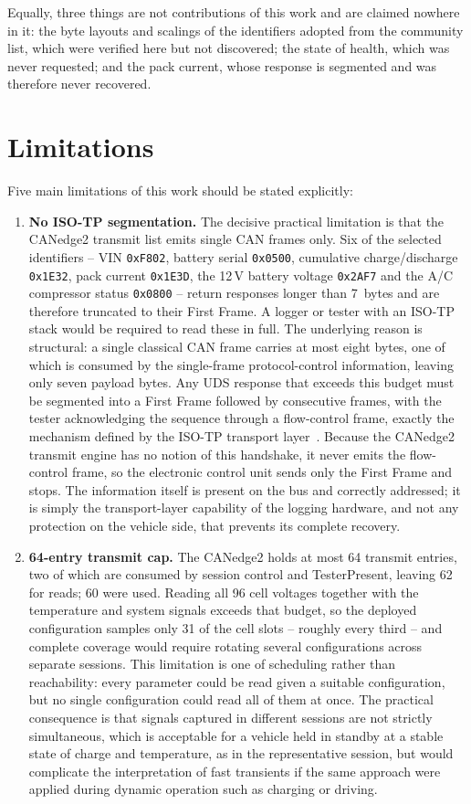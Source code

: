 \documentclass[11pt,a4paper,oneside,parskip=half]{scrreprt}
\providecommand{\hex}{}\renewcommand{\hex}[1]{\texttt{0x#1}}
\begin{document}
\noindent Equally, three things are not contributions of this work and are claimed nowhere in it: the byte layouts and scalings of the identifiers adopted from the community list, which were verified here but not discovered; the state of health, which was never requested; and the pack current, whose response is segmented and was therefore never recovered.

\section{Limitations}
Five main limitations of this work should be stated explicitly:

\begin{enumerate}
  \item \textbf{No ISO-TP segmentation.} The decisive practical limitation is that the CANedge2 transmit list emits single CAN frames only. Six of the selected identifiers -- VIN \hex{F802}, battery serial \hex{0500}, cumulative charge/discharge \hex{1E32}, pack current \hex{1E3D}, the 12\,V battery voltage \hex{2AF7} and the A/C compressor status \hex{0800} -- return responses longer than 7~bytes and are therefore truncated to their First Frame. A logger or tester with an ISO-TP stack would be required to read these in full. The underlying reason is structural: a single classical CAN frame carries at most eight bytes, one of which is consumed by the single-frame protocol-control information, leaving only seven payload bytes. Any UDS response that exceeds this budget must be segmented into a First Frame followed by consecutive frames, with the tester acknowledging the sequence through a flow-control frame, exactly the mechanism defined by the ISO-TP transport layer~\cite{iso15765}. Because the CANedge2 transmit engine has no notion of this handshake, it never emits the flow-control frame, so the electronic control unit sends only the First Frame and stops. The information itself is present on the bus and correctly addressed; it is simply the transport-layer capability of the logging hardware, and not any protection on the vehicle side, that prevents its complete recovery.
  \item \textbf{64-entry transmit cap.} The CANedge2 holds at most 64 transmit entries, two of which are consumed by session control and TesterPresent, leaving 62 for reads; 60 were used. Reading all 96 cell voltages together with the temperature and system signals exceeds that budget, so the deployed configuration samples only 31 of the cell slots -- roughly every third -- and complete coverage would require rotating several configurations across separate sessions. This limitation is one of scheduling rather than reachability: every parameter could be read given a suitable configuration, but no single configuration could read all of them at once. The practical consequence is that signals captured in different sessions are not strictly simultaneous, which is acceptable for a vehicle held in standby at a stable state of charge and temperature, as in the representative session, but would complicate the interpretation of fast transients if the same approach were applied during dynamic operation such as charging or driving.

\end{enumerate}
\end{document}
